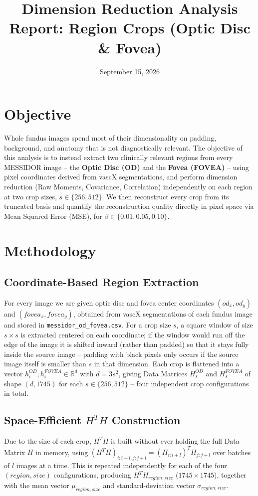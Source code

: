 \documentclass[a4paper,11pt]{article}
\title{\textbf{Dimension Reduction Analysis Report: Region Crops (Optic Disc \& Fovea)}}
\date{September 15, 2026}
\begin{document}
\maketitle

\section{Objective}
Whole fundus images spend most of their dimensionality on padding,
background, and anatomy that is not diagnostically relevant. The objective
of this analysis is to instead extract two clinically relevant regions from
every MESSIDOR image -- the \textbf{Optic Disc (OD)} and the \textbf{Fovea
(FOVEA)} -- using pixel coordinates derived from vascX segmentations, and
perform dimension reduction (Raw Moments, Covariance, Correlation)
independently on each region at two crop sizes, $s \in \{256, 512\}$. We
then reconstruct every crop from its truncated basis and quantify the
reconstruction quality directly in pixel space via Mean Squared Error (MSE),
for $\beta \in \{0.01, 0.05, 0.10\}$.

\section{Methodology}

\subsection{Coordinate-Based Region Extraction}
For every image we are given optic disc and fovea center coordinates
$(od_x,od_y)$ and $(fovea_x,fovea_y)$, obtained from vascX segmentations of
each fundus image and stored in \texttt{messidor\_od\_fovea.csv}. For a crop size $s$,
a square window of size $s\times s$ is extracted centered on each coordinate;
if the window would run off the edge of the image it is shifted inward
(rather than padded) so that it stays fully inside the source image --
padding with black pixels only occurs if the source image itself is smaller
than $s$ in that dimension. Each crop is flattened into a vector
$h_i^{OD}, h_i^{FOVEA} \in \mathbb{R}^d$ with $d = 3s^2$, giving Data
Matrices $H^{OD}_{s}$ and $H^{FOVEA}_{s}$ of shape $(d, 1745)$ for each
$s \in \{256, 512\}$ -- four independent crop configurations in total.

\subsection{Space-Efficient $H^TH$ Construction}
Due to the size of each crop, $H^TH$ is built without ever holding the full
Data Matrix $H$ in memory, using
$(H^TH)_{i:i+l,j:j+l} = (H_{i:i+l})^TH_{j:j+l}$ over batches of $l$ images
at a time. This is repeated independently for each of the four
$(region, size)$ configurations, producing $H^TH_{region,size}$
($1745\times1745$), together with the mean vector $\mu_{region,size}$ and
standard-deviation vector $\sigma_{region,size}$.
\end{document}
